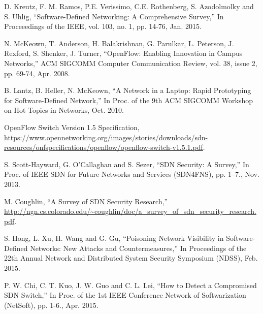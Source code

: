 \documentclass[conference]{IEEEtran}
\begin{document}
%
%
%
\begin{thebibliography}{1}
D. Kreutz, F. M. Ramos, P.E. Verissimo, C.E. Rothenberg, S. Azodolmolky and S. Uhlig,
``Software-Defined Networking: A Comprehensive Survey,'' In Proceeedings of the IEEE, vol. 103, no. 1, pp.  14-76, Jan. 2015.

N. McKeown, T. Anderson, H. Balakrishnan, G. Parulkar, L. Peterson, J. Rexford, S. Shenker, J. Turner,
``OpenFlow: Enabling Innovation in Campus Networks,'' ACM SIGCOMM Computer Communication Review, vol. 38, issue 2, pp. 69-74, Apr. 2008.

B. Lantz, B. Heller, N. McKeown,
``A Network in a Laptop: Rapid Prototyping for Software-Defined Network,'' In Proc. of the 9th ACM SIGCOMM Workshop on Hot Topics in Networks, Oct. 2010.

OpenFlow Switch Version 1.5 Specification, \url{https://www.opennetworking.org/images/stories/downloads/sdn-resources/onfspecifications/openflow/openflow-switch-v1.5.1.pdf}.

S. Scott-Hayward, G. O’Callaghan and S. Sezer,
``SDN Security: A Survey,'' In Proc. of IEEE SDN for Future Networks and Services (SDN4FNS), pp. 1–7., Nov. 2013.

M. Coughlin,
``A Survey of SDN Security Research,'' \url{http://ngn.cs.colorado.edu/~coughlin/doc/a_survey_of_sdn_security_research.pdf}.

S. Hong, L. Xu, H. Wang and G. Gu,
``Poisoning Network Visibility in Software-Defined Networks: New Attacks and Countermeasures,''  In Proceedings of the 22th Annual Network and Distributed System Security Symposium (NDSS), Feb. 2015.

P. W. Chi, C. T. Kuo, J. W. Guo and C. L. Lei,
``How to Detect a Compromised SDN Switch,'' In Proc. of the 1st IEEE Conference Network of Softwarization (NetSoft), pp. 1-6., Apr. 2015.


\end{thebibliography}
\end{document}
